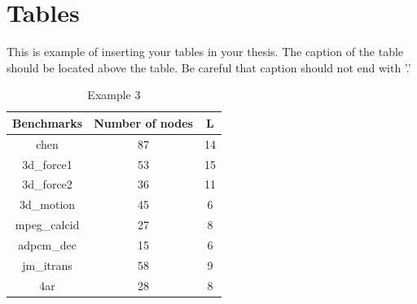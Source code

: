 \documentclass[master,korean]{snuee}
\begin{document}
    \section{Tables}
    This is example of inserting your tables in your thesis. The
    caption of the table should be located above the table. Be
    careful that caption should not end with '.'
    \begin{table}[htbp]
    \begin{center}
    \caption{Example 3} \label{tab1}
    \begin{tabular}{|c|c|c|} \hline
    Benchmarks & Number of nodes  & L\\ \hline
    \hline {\sc chen} & 87  & 14\\ \hline {\sc 3d\_force1} & 53  & 15\\
    \hline {\sc 3d\_force2} & 36  & 11\\ \hline {\sc 3d\_motion} & 45  &
    6\\ \hline {\sc mpeg\_calcid} & 27  & 8\\ \hline {\sc adpcm\_dec} &
    15  & 6 \\ \hline {\sc jm\_itrans} & 58  & 9\\ \hline {\sc 4ar} & 28
    & 8\\ \hline
    \end{tabular}
    \end{center}
    \end{table}

%
%

%
\end{document}
